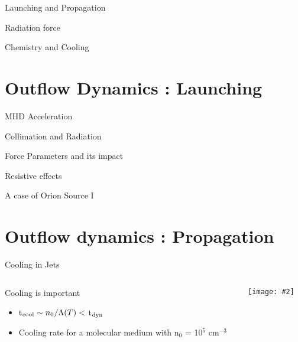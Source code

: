 \documentclass[8pt,xcolor=dvipsnames]{beamer}
\newcommand{\figpath}{./NEWFIGS/}
\newcommand{\spic}[2]{\texttt{[image: \#2]}}
\newcommand{\myref}[1]{{\small{\color{red}{(#1)}}}}
\begin{document}
\begin{frame}{Launching and Propagation}
\end{frame}

\begin{frame}{Radiation force}
\end{frame}

\begin{frame}{Chemistry and Cooling}
\end{frame}

\section{Outflow Dynamics : Launching}
\begin{frame}{MHD Acceleration}
\end{frame}

\begin{frame}{Collimation and Radiation}
\end{frame}

\begin{frame}{Force Parameters and its impact}
\end{frame}

\begin{frame}{Resistive effects}
\end{frame}

\begin{frame}{A case of Orion Source I}
\end{frame}

\section{Outflow dynamics : Propagation}

\begin{frame}{Cooling in Jets}
\begin{columns}
\begin{column}{0.3\textwidth}
\vspace{-3cm}
\begin{block}{Cooling is important}
\begin{itemize}
\item t$_{\rm cool} \sim n_0/\Lambda(T) <$ t$_{\rm dyn}$
  \myref{e.g, Blondin, 1990}\\
\item Cooling rate for a molecular medium with n$_0$ = 10$^{5}$ cm$^{-3}$
\end{itemize}
\end{block}
\end{column}
\begin{column}{0.6\textwidth}
\spic{0.3}{\figpath/pfig1.pdf}
\end{column}
\end{columns}
\end{frame}
\end{document}
